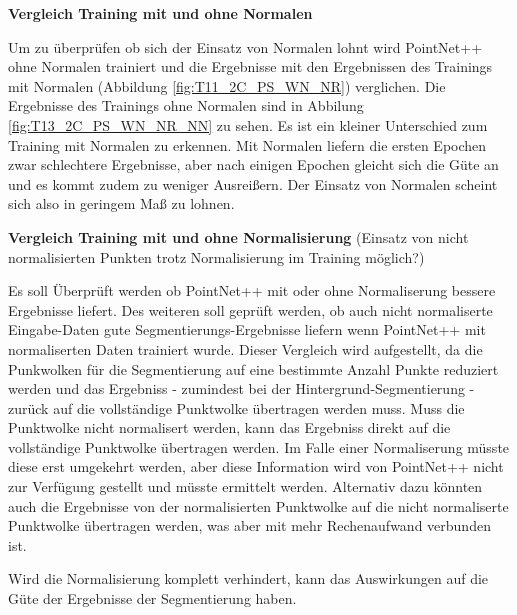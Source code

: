 \documentclass[12pt,titlepage, twoside]{article}
\begin{document}
\textbf{Vergleich Training mit und ohne Normalen}

Um zu überprüfen ob sich der Einsatz von Normalen lohnt wird PointNet++ ohne Normalen trainiert und die Ergebnisse mit den Ergebnissen des Trainings mit Normalen (Abbildung \ref{fig:T11_2C_PS_WN_NR}) verglichen. 
Die Ergebnisse des Trainings ohne Normalen sind in Abbilung \ref{fig:T13_2C_PS_WN_NR_NN} zu sehen. Es ist ein kleiner Unterschied zum Training mit Normalen zu erkennen. 
Mit Normalen liefern die ersten Epochen zwar schlechtere Ergebnisse, aber nach einigen Epochen gleicht sich die Güte an und es kommt zudem zu weniger Ausreißern. 
Der Einsatz von Normalen scheint sich also in geringem Maß zu lohnen. 

\textbf{Vergleich Training mit und ohne Normalisierung}  (Einsatz von nicht normalisierten Punkten trotz Normalisierung im Training möglich?)

Es soll Überprüft werden ob PointNet++ mit oder ohne Normaliserung bessere Ergebnisse liefert. 
Des weiteren soll geprüft werden, ob auch nicht normaliserte Eingabe-Daten gute Segmentierungs-Ergebnisse liefern wenn PointNet++ mit normaliserten Daten trainiert wurde.
Dieser Vergleich wird aufgestellt, da die Punkwolken für die Segmentierung auf eine bestimmte Anzahl Punkte reduziert werden und das Ergebniss - zumindest bei der Hintergrund-Segmentierung - zurück auf die vollständige Punktwolke übertragen werden muss.
Muss die Punktwolke nicht normalisert werden, kann das Ergebniss direkt auf die vollständige Punktwolke übertragen werden. 
Im Falle einer Normaliserung müsste diese erst umgekehrt werden, aber diese Information wird von PointNet++ nicht zur Verfügung gestellt und müsste ermittelt werden.
Alternativ dazu könnten auch die Ergebnisse von der normalisierten Punktwolke auf die nicht normaliserte Punktwolke übertragen werden, was aber mit mehr Rechenaufwand verbunden ist.

Wird die Normalisierung komplett verhindert, kann das Auswirkungen auf die Güte der Ergebnisse der Segmentierung haben.
\end{document}
